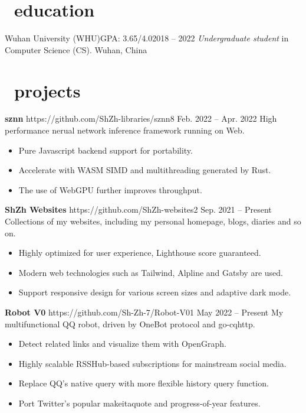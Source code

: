 \documentclass{common}
\begin{document}

\section{\faGraduationCap\ education}
\educationsubsection
    {Wuhan University (WHU)}{GPA: 3.65/4.0}{2018 -- 2022}
    {\textit{Undergraduate student} in Computer Science (CS). }{Wuhan, China}

\section{\faCubes\ projects}
\projectsubsection
    {\textbf{sznn}}
    {https://github.com/ShZh-libraries/sznn}{8}
    {Feb. 2022 -- Apr. 2022}
High performance nerual network inference framework running on Web.
\begin{itemize}
    \item Pure Javascript backend support for portability.
    \item Accelerate with WASM SIMD and multithreading generated by Rust.
    \item The use of WebGPU further improves throughput.
\end{itemize}
\projectsubsection
    {\textbf{ShZh Websites}}
    {https://github.com/ShZh-websites}{2}
    {Sep. 2021 -- Present}
Collections of my websites, including my personal homepage, blogs, diaries and so on.
\begin{itemize}
    \item Highly optimized for user experience, Lighthouse score guaranteed.
    \item Modern web technologies such as Tailwind, Alpline and Gatsby are used.
    \item Support responsive design for various screen sizes and adaptive dark mode.
\end{itemize}
\projectsubsection
    {\textbf{Robot V0}}
    {https://github.com/Sh-Zh-7/Robot-V0}{1}
    {May 2022 -- Present}
My multifunctional QQ robot, driven by OneBot protocol and go-cqhttp.
\begin{itemize}
    \item Detect related links and visualize them with OpenGraph.
    \item Highly scalable RSSHub-based subscriptions for mainstream social media.
    \item Replace QQ's native query with more flexible history query function.
    \item Port Twitter's popular makeitaquote and progress-of-year features.
\end{itemize}
\end{document}

